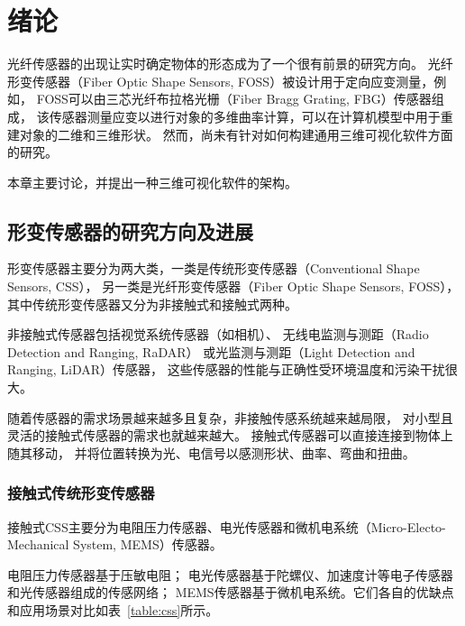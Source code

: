 \clearpage
\setcounter{page}{1}

\section{绪论}
\label{sec:intro}

光纤传感器的出现让实时确定物体的形态成为了一个很有前景的研究方向\cite{recent-dev-in-foss}。
光纤形变传感器（Fiber Optic Shape Sensors, FOSS）被设计用于定向应变测量，例如，
FOSS可以由三芯光纤布拉格光栅（Fiber Bragg Grating, FBG）传感器组成，
该传感器测量应变以进行对象的多维曲率计算，可以在计算机模型中用于重建对象的二维和三维形状。
然而，尚未有针对如何构建通用三维可视化软件方面的研究。

本章主要讨论，并提出一种三维可视化软件的架构。

\subsection{形变传感器的研究方向及进展}
\label{sec:ss}

形变传感器主要分为两大类，一类是传统形变传感器（Conventional Shape Sensors, CSS），
另一类是光纤形变传感器（Fiber Optic Shape Sensors, FOSS）， 
其中传统形变传感器又分为非接触式和接触式两种。

非接触式传感器包括视觉系统传感器（如相机）、
无线电监测与测距（Radio Detection and Ranging, RaDAR）
或光监测与测距（Light Detection and Ranging, LiDAR）传感器，
这些传感器的性能与正确性受环境温度和污染干扰很大。

随着传感器的需求场景越来越多且复杂，非接触传感系统越来越局限，
对小型且灵活的接触式传感器的需求也就越来越大。
接触式传感器可以直接连接到物体上随其移动，
并将位置转换为光、电信号以感测形状、曲率、弯曲和扭曲。

\subsubsection{接触式传统形变传感器}

接触式CSS主要分为电阻压力传感器、电光传感器和微机电系统（Micro-Electo-Mechanical System, MEMS）传感器。

电阻压力传感器基于压敏电阻；
电光传感器基于陀螺仪、加速度计等电子传感器和光传感器组成的传感网络；
MEMS传感器基于微机电系统。它们各自的优缺点和应用场景对比如表~\ref{table:css}所示。

